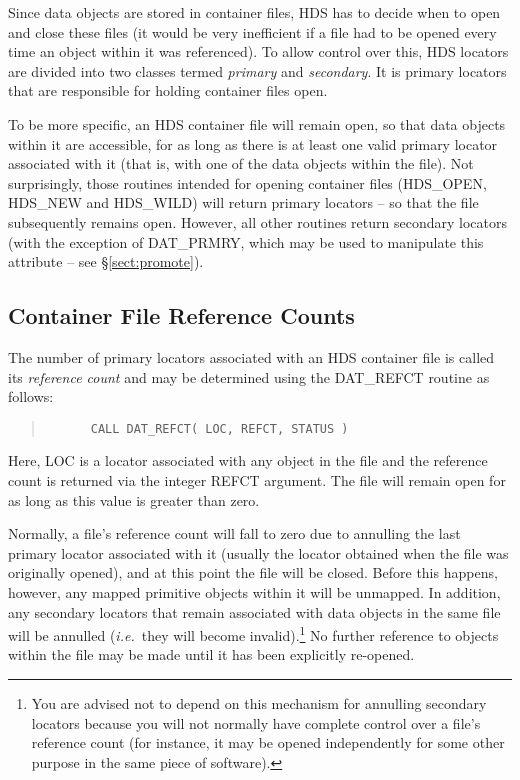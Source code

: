 \documentclass[11pt]{article}
\newcommand{\htmlref}[2]{#1}
\newcommand{\xlabel}[1]{}
\newcommand{\st}[1]{{\em{#1}}}
\begin{document}
Since data objects are stored in container files, HDS has to decide
when to open and close these files (it would be very inefficient if a
file had to be opened every time an object within it was
referenced). To allow control over this, HDS locators are divided into
two classes termed \st{primary} and \st{secondary}. It is primary
locators that are responsible for holding container files open.

To be more specific, an HDS container file will remain open, so that
data objects within it are accessible, for as long as there is at
least one valid primary locator associated with it (that is, with one
of the data objects within the file). Not surprisingly, those routines
intended for opening container files (\htmlref{HDS\_OPEN}{HDS_OPEN},
\htmlref{HDS\_NEW}{HDS_NEW} and \htmlref{HDS\_WILD}{HDS_WILD}) will
return primary locators -- so that the file subsequently remains
open. However, all other routines return secondary locators (with the
exception of \htmlref{DAT\_PRMRY}{DAT_PRMRY}, which may be used to
manipulate this attribute -- see \S\ref{sect:promote}).

\subsection{\xlabel{container_file_reference_counts}\label{sect:refct}Container File Reference Counts}

The number of \htmlref{primary}{sect:primary} locators associated with
an HDS container file is called its \st{reference count} and may be
determined using the \htmlref{DAT\_REFCT}{DAT_REFCT} routine as
follows:

\small
\begin{quote}
\begin{verbatim}
      CALL DAT_REFCT( LOC, REFCT, STATUS )
\end{verbatim}
\end{quote}
\normalsize

Here, LOC is a locator associated with any object in the file and the
reference count is returned via the integer REFCT argument. The file
will remain open for as long as this value is greater than zero.

Normally, a file's reference count will fall to zero due to
\htmlref{annulling}{sect:annul} the last primary locator associated
with it (usually the locator obtained when the file was originally
opened), and at this point the file will be closed. Before this
happens, however, any mapped primitive objects within it will be
unmapped. In addition, any secondary locators that remain associated
with data objects in the same file will be annulled (\st{i.e.}\ they
will become invalid).\footnote{You are advised not to depend on this
mechanism for annulling secondary locators because you will not
normally have complete control over a file's reference count (for
instance, it may be opened independently for some other purpose in the
same piece of software).} No further reference to objects within the
file may be made until it has been explicitly re-opened.
\end{document}
